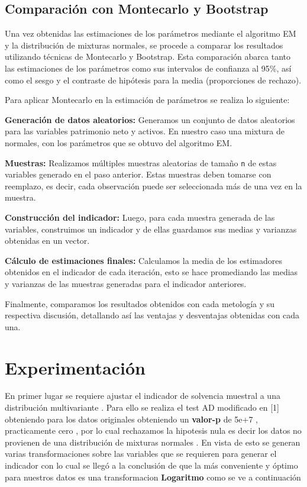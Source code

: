 \documentclass[
]{article}
\begin{document}
\hypertarget{comparaciuxf3n-con-montecarlo-y-bootstrap}{%
\subsection{Comparación con Montecarlo y
Bootstrap}\label{comparaciuxf3n-con-montecarlo-y-bootstrap}}

Una vez obtenidas las estimaciones de los parámetros mediante el
algoritmo EM y la distribución de mixturas normales, se procede a
comparar los resultados utilizando técnicas de Montecarlo y Bootstrap.
Esta comparación abarca tanto las estimaciones de los parámetros como
sus intervalos de confianza al 95\%, así como el sesgo y el contraste de
hipótesis para la media (proporciones de rechazo).

Para aplicar Montecarlo en la estimación de parámetros se realiza lo
siguiente:

\textbf{Generación de datos aleatorios:} Generamos un conjunto de datos
aleatorios para las variables patrimonio neto y activos. En nuestro caso
una mixtura de normales, con los parámetros que se obtuvo del algoritmo
EM.

\textbf{Muestras:} Realizamos múltiples muestras aleatorias de tamaño
\texttt{n} de estas variables generado en el paso anterior. Estas
muestras deben tomarse con reemplazo, es decir, cada observación puede
ser seleccionada más de una vez en la muestra.

\textbf{Construcción del indicador:} Luego, para cada muestra generada
de las variables, construimos un indicador y de ellas guardamos sus
medias y varianzas obtenidas en un vector.

\textbf{Cálculo de estimaciones finales:} Calculamos la media de los
estimadores obtenidos en el indicador de cada iteración, esto se hace
promediando las medias y varianzas de las muestras generadas para el
indicador anteriores.

Finalmente, comparamos los resultados obtenidos con cada metología y su
respectiva discusión, detallando así las ventajas y desventajas
obtenidas con cada una.

\hypertarget{experimentaciuxf3n}{%
\section{Experimentación}\label{experimentaciuxf3n}}

En primer lugar se requiere ajustar el indicador de solvencia muestral a
una distribución multivariante . Para ello se realiza el test AD
modificado en {[}1{]} obteniendo para los datos originales obteniendo un
\textbf{valor-p} de 5e+7 , practicamente cero , por lo cual rechazamos
la hipotesis nula es decir los datos no provienen de una distribución de
mixturas normales . En vista de esto se generan varias transformaciones
sobre las variables que se requieren para generar el indicador con lo
cual se llegó a la conclusión de que la más conveniente y óptimo para
nuestros datos es una transformacion \textbf{Logaritmo} como se ve a
continuación
\end{document}
